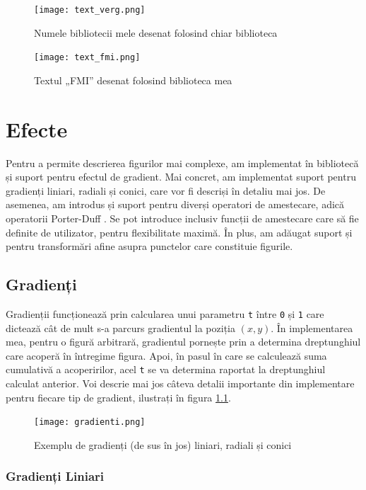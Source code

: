\documentclass[a4paper, 12pt]{report}
\begin{document}
\begin{figure}[ht]
    \texttt{[image: text\_verg.png]}
    \centering
    \caption{Numele bibliotecii mele desenat folosind chiar biblioteca}
    \label{fig-text-verg}
\end{figure}

\begin{figure}[ht]
    \texttt{[image: text\_fmi.png]}
    \centering
    \caption{Textul „FMI” desenat folosind biblioteca mea}
    \label{fig-text-fmi}
\end{figure}

\chapter{Efecte}

Pentru a permite descrierea figurilor mai complexe, am implementat în bibliotecă și suport pentru efectul de gradient.
Mai concret, am implementat suport pentru gradienți liniari, radiali și conici, care vor fi descriși în detaliu mai jos.
De asemenea, am introdus și suport pentru diverși operatori de amestecare, adică operatorii Porter-Duff \cite{Porter-Duff}.
Se pot introduce inclusiv funcții de amestecare care să fie definite de utilizator, pentru flexibilitate maximă. În plus,
am adăugat suport și pentru transformări afine asupra punctelor care constituie figurile.

\section{Gradienți}

Gradienții funcționează prin calcularea unui parametru \texttt{t} între \texttt{0} și \texttt{1} care dictează cât de mult
s-a parcurs gradientul la poziția \((x, y)\). În implementarea mea, pentru o figură arbitrară, gradientul pornește prin a
determina dreptunghiul care acoperă în întregime figura. Apoi, în pasul în care se calculează suma cumulativă a acoperirilor,
acel \texttt{t} se va determina raportat la dreptunghiul calculat anterior. Voi descrie mai jos câteva detalii importante din
implementare pentru fiecare tip de gradient, ilustrați în figura \ref{fig-gradients}.

\begin{figure}[ht]
    \texttt{[image: gradienti.png]}
    \centering
    \caption{Exemplu de gradienți (de sus în jos) liniari, radiali și conici}
    \label{fig-gradients}
\end{figure}

\subsection{Gradienți Liniari}
\end{document}
